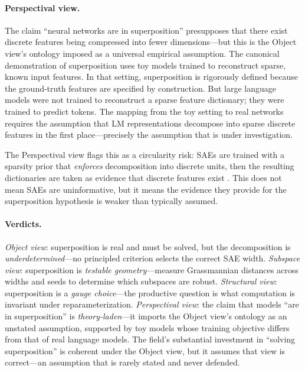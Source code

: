 \documentclass{article}
\begin{document}
\paragraph{Perspectival view.}
The claim ``neural networks are in superposition'' presupposes that there exist discrete features being compressed into fewer dimensions---but this is the Object view's ontology imposed as a universal empirical assumption. The canonical demonstration of superposition \citep{elhage2022superposition} uses toy models trained to reconstruct sparse, known input features. In that setting, superposition is rigorously defined because the ground-truth features are specified by construction. But large language models were not trained to reconstruct a sparse feature dictionary; they were trained to predict tokens. The mapping from the toy setting to real networks requires the assumption that LM representations decompose into sparse discrete features in the first place---precisely the assumption that is under investigation.

The Perspectival view flags this as a circularity risk: SAEs are trained with a sparsity prior that \emph{enforces} decomposition into discrete units, then the resulting dictionaries are taken as evidence that discrete features exist \citep{leask2025}. This does not mean SAEs are uninformative, but it means the evidence they provide for the superposition hypothesis is weaker than typically assumed.

\paragraph{Verdicts.}
\emph{Object view}: superposition is real and must be solved, but the decomposition is \emph{underdetermined}---no principled criterion selects the correct SAE width.
\emph{Subspace view}: superposition is \emph{testable geometry}---measure Grassmannian distances across widths and seeds to determine which subspaces are robust.
\emph{Structural view}: superposition is a \emph{gauge choice}---the productive question is what computation is invariant under reparameterization.
\emph{Perspectival view}: the claim that models ``are in superposition'' is \emph{theory-laden}---it imports the Object view's ontology as an unstated assumption, supported by toy models whose training objective differs from that of real language models.
The field's substantial investment in ``solving superposition'' is coherent under the Object view, but it assumes that view is correct---an assumption that is rarely stated and never defended.
\end{document}
